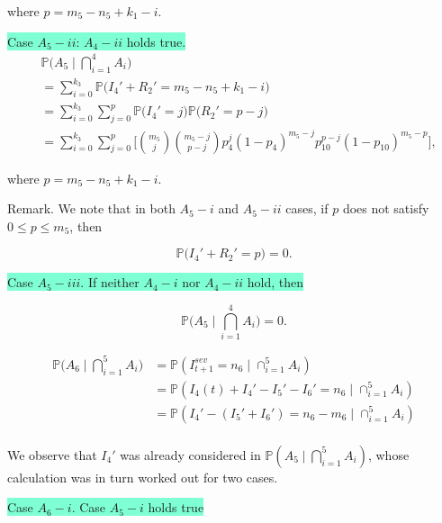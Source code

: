 \documentclass[a4paper]{article}
\theoremstyle{remark}
\begin{document}
where $p=m_5-n_5+k_1-i$.  

\medskip
\colorbox{Aquamarine}{Case $A_5-ii$: $A_4-ii$ holds true.} 
\begin{equation*}
\begin{split}
&\mathbb{P}\bigg(A_{5}\mid \bigcap_{i=1}^{4}A_{i}\bigg)\\
&= \sum_{i=0}^{k_3} \mathbb{P}\bigg(I_{4}'+R_{2}'=m_5-n_5+k_1-i\bigg)\\
&=\sum_{i=0}^{k_3}\sum_{j=0}^{p} \mathbb{P}\bigg(I_{4}'=j\bigg) \mathbb{P}\bigg(R_{2}'=p-j\bigg)\\
&=\sum_{i=0}^{k_3}\sum_{j=0}^{p} \Bigg[{m_5 \choose j}{m_5-j \choose p-j}p_4^{j}(1-p_4)^{m_5-j}p_{10}^{p-j}(1-p_{10})^{m_5-p}\Bigg],
\end{split}
\end{equation*}

where $p=m_5-n_5+k_1-i$. 

\medskip
Remark. We note that in both $A_5-i$ and $A_5-ii$ cases, if $p$ does not satisfy $0\leq p \leq m_5$, then   

\[\mathbb{P}\big(I_{4}'+R_{2}'=p\big)=0.\]

\medskip

\colorbox{Aquamarine}{Case $A_5-iii$. If neither $A_4-i$ nor $A_4-ii$ hold, then}

\[\mathbb{P}\bigg(A_{5}\mid \bigcap_{i=1}^{4}A_{i}\bigg)=0.\]


\medskip

\hline


\begin{align*}
   \mathbb{P}\bigg(A_{6}\mid \bigcap_{i=1}^{5}A_{i}\bigg)&=\mathbb{P}(I_{t+1}^{sev}=n_6 
   \mid\cap_{i=1}^{5}A_{i})\\
   &= \mathbb{P}(I_4(t)+I_{4}'-I_{5}'-I_{6}'=n_6\mid \cap_{i=1}^{5}A_{i})\\
   &= \mathbb{P}(I_{4}'-(I_{5}'+I_{6}')=n_6-m_6\mid \cap_{i=1}^{5}A_{i})\\
\end{align*}


We observe that $I_4'$ was already considered in $\mathbb{P}(A_{5}\mid \bigcap_{i=1}^{5}A_{i})$, whose calculation was in turn worked out for two cases. 

\colorbox{Aquamarine}{Case $A_6-i$. Case $A_5-i$ holds true}%
\end{document}
